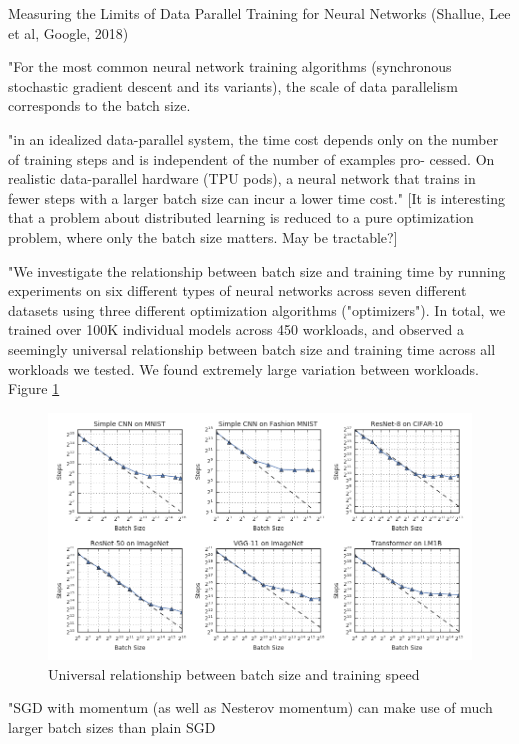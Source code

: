 \documentclass[english]{article}
\begin{document}
\item Measuring the Limits of Data Parallel Training for Neural Networks (Shallue, Lee et al, Google, 2018)

"For the most common neural network training algorithms (synchronous stochastic gradient descent and its variants), the scale of data parallelism corresponds to the batch size.

"in an idealized data-parallel system, the time cost depends
only on the number of training steps and is independent of the number of examples pro-
cessed. On realistic data-parallel hardware (TPU pods),
a neural network that trains in fewer steps with a larger batch size can incur a lower time
cost." [It is interesting that a problem about distributed learning is reduced to a pure optimization problem, where only the batch size matters. May be tractable?]

"We investigate the relationship between batch size and training time by running experiments on six different types of neural networks across seven different datasets using three different optimization algorithms ("optimizers"). In total, we trained over 100K individual models across 450 workloads, and observed a seemingly universal relationship between batch size and training time across all workloads we tested. We found extremely large variation between workloads. Figure \ref{Bsts}

\begin{figure}
\begin{center}
\includegraphics[width=0.7\paperwidth]{bsts}
    \caption{Universal relationship between batch size and training speed}
    \label{Bsts}
\end{center}
\end{figure}

"SGD with momentum (as well as Nesterov momentum) can make use of much
larger batch sizes than plain SGD
\end{document}
